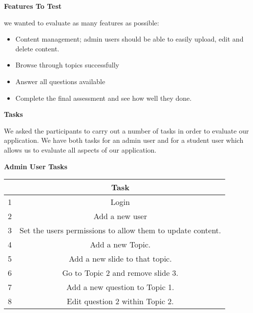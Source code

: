 \documentclass{l3proj}
\begin{document}
\textbf{Features To Test} 

we wanted to evaluate as many features as possible:

\begin{itemize}
\item Content management; admin users should be able to easily upload, edit and delete content.
\item Browse through topics successfully
\item Answer all questions available
\item Complete the final assessment and see how well they done.
\end{itemize}

\textbf{Tasks}

We asked the participants to carry out a number of tasks in order to evaluate our application. We have both tasks for an admin user and for a student user which allows us to evaluate all aspects of our application.

\textbf{Admin User Tasks}


\begin{tabular}{|c|c|}
\hline & \textbf{Task}\\
\hline
\hline 1 & Login\\
\hline 2 & Add a new user\\
\hline 3 & Set the users permissions to allow them to update content.\\
\hline 4 & Add a new Topic.\\
\hline 5 & Add a new slide to that topic.\\
\hline 6 & Go to Topic 2 and remove slide 3.\\
\hline 7 & Add a new question to Topic 1.\\
\hline 8 & Edit question 2 within Topic 2.\\
\hline
\end{tabular}

\end{document}
